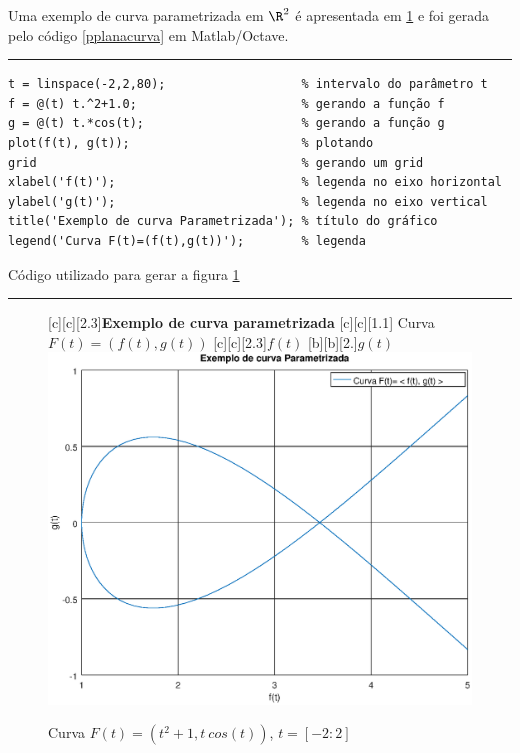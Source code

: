  Uma exemplo de curva parametrizada em $\R^2$ é apresentada  em \ref{fig.pplanacurva} e foi gerada pelo código \ref{pplanacurva} em Matlab/Octave.

\begin{Codigo}[htpb]
\noindent\rule{13cm}{1.pt}
\begin{verbatim}
t = linspace(-2,2,80);                   % intervalo do parâmetro t
f = @(t) t.^2+1.0;                       % gerando a função f
g = @(t) t.*cos(t);                      % gerando a função g 
plot(f(t), g(t));                        % plotando 
grid                                     % gerando um grid
xlabel('f(t)');                          % legenda no eixo horizontal
ylabel('g(t)');                          % legenda no eixo vertical
title('Exemplo de curva Parametrizada'); % título do gráfico 
legend('Curva F(t)=(f(t),g(t))');        % legenda
\end{verbatim}
\vspace{-0.5cm}
\caption{Código utilizado para gerar a figura \ref{fig.pplanacurva} } 
\noindent\rule{13cm}{1.pt}
\label{pplanacurva}
\end{Codigo}


\begin{figure}[htpb]
\begin{center} 
[c][c][2.3]{\textbf{Exemplo de curva parametrizada}}
[c][c][1.1]{\hspace{0.5cm} Curva $F(t)=(f(t),g(t))$}
[c][c][2.3]{$f(t)$}
[b][b][2.]{$g(t)$}
\includegraphics*[angle=0,scale=0.5]{imagens/cap2/pplanacurva.eps}
\caption{Curva $F(t) = (t^2+1, t\ cos(t))$, $t=[-2:2]$} 
\label{fig.pplanacurva}
\end{center}
\end{figure}

